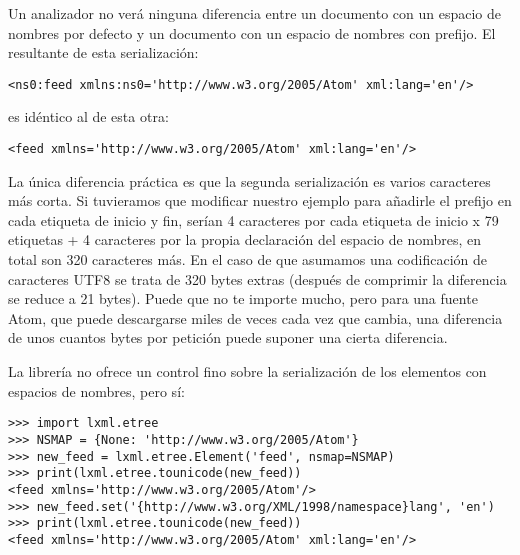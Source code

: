 Un analizador  no verá ninguna diferencia entre un documento  con un espacio de nombres por defecto y un documento  con un espacio de nombres con prefijo. El  resultante de esta serialización:

\noindent\begin{minipage}{\textwidth}
\begin{lstlisting}[mathescape=True]
<ns0:feed xmlns:ns0='http://www.w3.org/2005/Atom' xml:lang='en'/>
\end{lstlisting}
\end{minipage}

es idéntico al  de esta otra:

\noindent\begin{minipage}{\textwidth}
\begin{lstlisting}[mathescape=True]
<feed xmlns='http://www.w3.org/2005/Atom' xml:lang='en'/>
\end{lstlisting}
\end{minipage}

La única diferencia práctica es que la segunda serialización es varios caracteres más corta. Si tuvieramos que modificar nuestro ejemplo para añadirle el prefijo  en cada etiqueta de inicio y fin, serían 4 caracteres por cada etiqueta de inicio x 79 etiquetas + 4 caracteres por la propia declaración del espacio de nombres, en total son 320 caracteres más. En el caso de que asumamos una codificación de caracteres UTF8 se trata de 320 bytes extras (después de comprimir la diferencia se reduce a 21 bytes). Puede que no te importe mucho, pero para una fuente Atom, que puede descargarse miles de veces cada vez que cambia, una diferencia de unos cuantos bytes por petición puede suponer una cierta diferencia.

La librería  no ofrece un control fino sobre la serialización de los elementos con espacios de nombres, pero  sí:

\noindent\begin{minipage}{\textwidth}
\begin{lstlisting}[mathescape=True]
>>> import lxml.etree
>>> NSMAP = {None: 'http://www.w3.org/2005/Atom'}
>>> new_feed = lxml.etree.Element('feed', nsmap=NSMAP)
>>> print(lxml.etree.tounicode(new_feed))
<feed xmlns='http://www.w3.org/2005/Atom'/>
>>> new_feed.set('{http://www.w3.org/XML/1998/namespace}lang', 'en')
>>> print(lxml.etree.tounicode(new_feed))
<feed xmlns='http://www.w3.org/2005/Atom' xml:lang='en'/>
\end{lstlisting}
\end{minipage}

